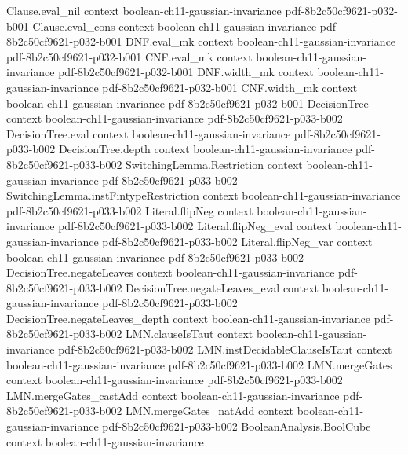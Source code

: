 \begin{lemma}
\proofstep
  {Clause.eval_nil}
  {context}
  {boolean-ch11-gaussian-invariance}
  {pdf-8b2c50cf9621-p032-b001}
\proofstep
  {Clause.eval_cons}
  {context}
  {boolean-ch11-gaussian-invariance}
  {pdf-8b2c50cf9621-p032-b001}
\proofstep
  {DNF.eval_mk}
  {context}
  {boolean-ch11-gaussian-invariance}
  {pdf-8b2c50cf9621-p032-b001}
\proofstep
  {CNF.eval_mk}
  {context}
  {boolean-ch11-gaussian-invariance}
  {pdf-8b2c50cf9621-p032-b001}
\proofstep
  {DNF.width_mk}
  {context}
  {boolean-ch11-gaussian-invariance}
  {pdf-8b2c50cf9621-p032-b001}
\proofstep
  {CNF.width_mk}
  {context}
  {boolean-ch11-gaussian-invariance}
  {pdf-8b2c50cf9621-p032-b001}
\proofstep
  {DecisionTree}
  {context}
  {boolean-ch11-gaussian-invariance}
  {pdf-8b2c50cf9621-p033-b002}
\proofstep
  {DecisionTree.eval}
  {context}
  {boolean-ch11-gaussian-invariance}
  {pdf-8b2c50cf9621-p033-b002}
\proofstep
  {DecisionTree.depth}
  {context}
  {boolean-ch11-gaussian-invariance}
  {pdf-8b2c50cf9621-p033-b002}
\proofstep
  {SwitchingLemma.Restriction}
  {context}
  {boolean-ch11-gaussian-invariance}
  {pdf-8b2c50cf9621-p033-b002}
\proofstep
  {SwitchingLemma.instFintypeRestriction}
  {context}
  {boolean-ch11-gaussian-invariance}
  {pdf-8b2c50cf9621-p033-b002}
\proofstep
  {Literal.flipNeg}
  {context}
  {boolean-ch11-gaussian-invariance}
  {pdf-8b2c50cf9621-p033-b002}
\proofstep
  {Literal.flipNeg_eval}
  {context}
  {boolean-ch11-gaussian-invariance}
  {pdf-8b2c50cf9621-p033-b002}
\proofstep
  {Literal.flipNeg_var}
  {context}
  {boolean-ch11-gaussian-invariance}
  {pdf-8b2c50cf9621-p033-b002}
\proofstep
  {DecisionTree.negateLeaves}
  {context}
  {boolean-ch11-gaussian-invariance}
  {pdf-8b2c50cf9621-p033-b002}
\proofstep
  {DecisionTree.negateLeaves_eval}
  {context}
  {boolean-ch11-gaussian-invariance}
  {pdf-8b2c50cf9621-p033-b002}
\proofstep
  {DecisionTree.negateLeaves_depth}
  {context}
  {boolean-ch11-gaussian-invariance}
  {pdf-8b2c50cf9621-p033-b002}
\proofstep
  {LMN.clauseIsTaut}
  {context}
  {boolean-ch11-gaussian-invariance}
  {pdf-8b2c50cf9621-p033-b002}
\proofstep
  {LMN.instDecidableClauseIsTaut}
  {context}
  {boolean-ch11-gaussian-invariance}
  {pdf-8b2c50cf9621-p033-b002}
\proofstep
  {LMN.mergeGates}
  {context}
  {boolean-ch11-gaussian-invariance}
  {pdf-8b2c50cf9621-p033-b002}
\proofstep
  {LMN.mergeGates_castAdd}
  {context}
  {boolean-ch11-gaussian-invariance}
  {pdf-8b2c50cf9621-p033-b002}
\proofstep
  {LMN.mergeGates_natAdd}
  {context}
  {boolean-ch11-gaussian-invariance}
  {pdf-8b2c50cf9621-p033-b002}
\proofstep
  {BooleanAnalysis.BoolCube}
  {context}
  {boolean-ch11-gaussian-invariance}

\end{lemma}
